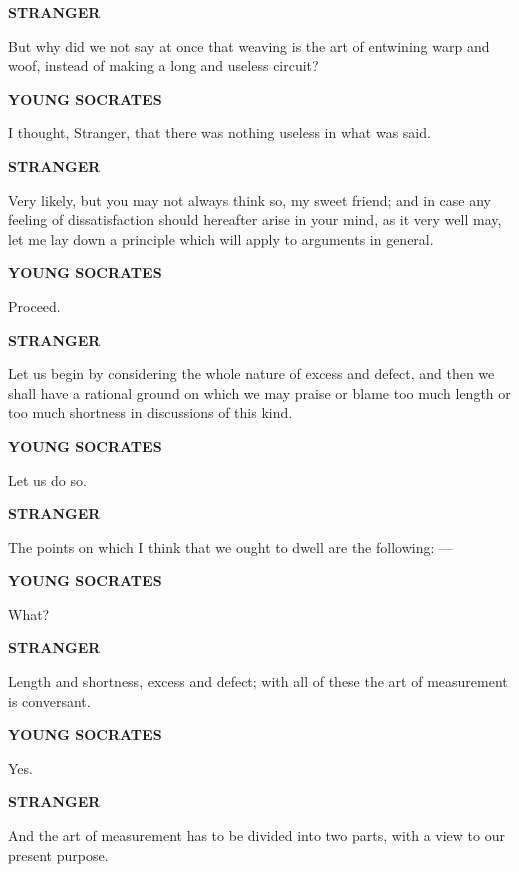 \documentclass[11pt,letter]{article}
\begin{document}
\par \textbf{STRANGER}
\par   But why did we not say at once that weaving is the art of entwining warp and woof, instead of making a long and useless circuit?

\par \textbf{YOUNG SOCRATES}
\par   I thought, Stranger, that there was nothing useless in what was said.

\par \textbf{STRANGER}
\par   Very likely, but you may not always think so, my sweet friend; and in case any feeling of dissatisfaction should hereafter arise in your mind, as it very well may, let me lay down a principle which will apply to arguments in general.

\par \textbf{YOUNG SOCRATES}
\par   Proceed.

\par \textbf{STRANGER}
\par   Let us begin by considering the whole nature of excess and defect, and then we shall have a rational ground on which we may praise or blame too much length or too much shortness in discussions of this kind.

\par \textbf{YOUNG SOCRATES}
\par   Let us do so.

\par \textbf{STRANGER}
\par   The points on which I think that we ought to dwell are the following: —

\par \textbf{YOUNG SOCRATES}
\par   What?

\par \textbf{STRANGER}
\par   Length and shortness, excess and defect; with all of these the art of measurement is conversant.

\par \textbf{YOUNG SOCRATES}
\par   Yes.

\par \textbf{STRANGER}
\par   And the art of measurement has to be divided into two parts, with a view to our present purpose.
\end{document}
